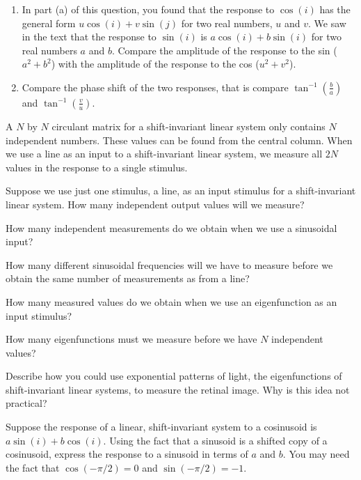 \begin{enumerate}
 \item  In part (a) of this question,
you found that the response to $\cos(i)$ has the
general form $u \cos(i) + v \sin(j)$ for two real
numbers, $u$ and $v$.
We saw in the text that the response to $\sin(i)$ is
$a \cos(i) + b \sin(i)$ for two real numbers $a$ and $b$.
Compare the amplitude of the response to the sin
($a^2 + b^2$) with the amplitude of
the response to the cos ($u^2 + v^2$).

 \item Compare the phase shift of the
two responses, that is compare
$\tan ^{-1} ( \frac{b}{a} ) $ and $\tan ^ {-1} ( \frac{v}{u})$.

 \end{enumerate}

\item A $N$ by $N$ circulant matrix for
a shift-invariant linear system only contains
$N$ independent numbers.
These values can be found from the central column.
When we use a line as an input to a shift-invariant
linear system, we measure all $2N$ values in the response to 
a single stimulus.

 \be

 \item Suppose we use just one stimulus, a line,
as an input stimulus for a shift-invariant linear system.
How many independent output values will we measure?

\item How many independent measurements do we obtain when we
use a sinusoidal input?
\item How many different sinusoidal frequencies will we have
to measure before we obtain the same
number of measurements as from a line?
\item How many measured values do we obtain when we use
an eigenfunction as an input stimulus?
\item How many eigenfunctions must we measure before
we have $N$ independent values?

\item Describe how you could use exponential patterns of light,
the eigenfunctions of shift-invariant linear systems,
to measure the retinal image.
Why is this idea not practical?

 \ee

\item Suppose the response of
a linear, shift-invariant system to
a cosinusoid is $a \sin(i) +  b \cos(i) $.
Using the fact that a sinusoid is a shifted copy of
a cosinusoid, express the response to a sinusoid in terms of $a$ and $b$.
You may need the fact that $\cos( - \pi /2 ) = 0$ 
and $\sin ( - \pi / 2 )  = -1$.

